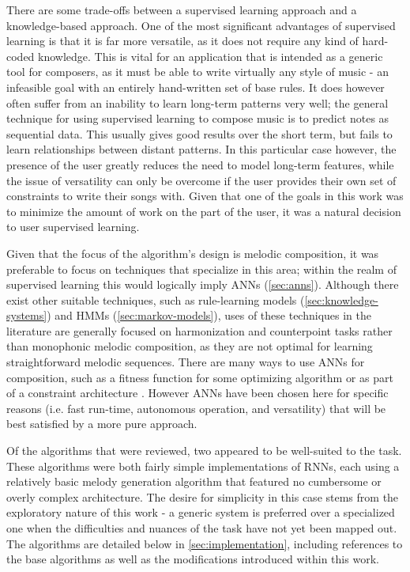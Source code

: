 \documentclass[ author={Stephen Livermore-Tozer},
				supervisor={Dr. Peter Flach},
				degree={MEng},
				title={Algorithmic Co-composition Using Machine Learning},
				subtitle={},
				type={research},
				year={2016} ]{dissertation}
\begin{document}
	There are some trade-offs between a supervised learning approach and a knowledge-based approach. One of the most significant advantages of supervised learning is that it is far more versatile, as it does not require any kind of hard-coded knowledge. This is vital for an application that is intended as a generic tool for composers, as it must be able to write virtually any style of music - an infeasible goal with an entirely hand-written set of base rules. It does however often suffer from an inability to learn long-term patterns very well; the general technique for using supervised learning to compose music is to predict notes as sequential data. This usually gives good results over the short term, but fails to learn relationships between distant patterns. In this particular case however, the presence of the user greatly reduces the need to model long-term features, while the issue of versatility can only be overcome if the user provides their own set of constraints to write their songs with. Given that one of the goals in this work was to minimize the amount of work on the part of the user, it was a natural decision to user supervised learning.
	
	Given that the focus of the algorithm's design is melodic composition, it was preferable to focus on techniques that specialize in this area; within the realm of supervised learning this would logically imply ANNs (\ref{sec:anns}). Although there exist other suitable techniques, such as rule-learning models (\ref{sec:knowledge-systems}) and HMMs (\ref{sec:markov-models}), uses of these techniques in the literature are generally focused on harmonization and counterpoint tasks rather than monophonic melodic composition, as they are not optimal for learning straightforward melodic sequences. There are many ways to use ANNs for composition, such as a fitness function for some optimizing algorithm \cite{manaris2007corpus} or as part of a constraint architecture \cite{hild1992harmonet}. However ANNs have been chosen here for specific reasons (i.e. fast run-time, autonomous operation, and versatility) that will be best satisfied by a more pure approach.
	
	Of the algorithms that were reviewed, two appeared to be well-suited to the task. These algorithms were both fairly simple implementations of RNNs, each using a relatively basic melody generation algorithm that featured no cumbersome or overly complex architecture. The desire for simplicity in this case stems from the exploratory nature of this work - a generic system is preferred over a specialized one when the difficulties and nuances of the task have not yet been mapped out. The algorithms are detailed below in \ref{sec:implementation}, including references to the base algorithms as well as the modifications introduced within this work.
	
\end{document}
